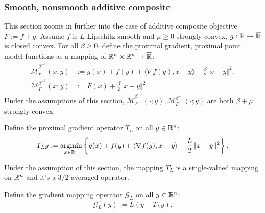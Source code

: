 \documentclass[12pt]{article}
\begin{document}
        \subsubsection{Smooth, nonsmooth additive composite}\label{sssec:additive-composite}
            This section zooms in further into the case of additive composite objective $F:= f + g$. 
            Assume $f$ is $L$ Lipschitz smooth and $\mu \ge 0$ strongly convex, $g: \mathbb R\rightarrow \overline {\mathbb R}$ is closed convex. 
            For all $\beta \ge 0$, define the proximal gradient, proximal point model functions as a mapping of $\mathbb R^n \times \mathbb R^n \rightarrow \overline {\mathbb R}$: 
            \begin{align*}
                \widetilde{\mathcal M}^{\beta^{-1}}_F
                (x; y)
                &:= 
                g(x) + f(y) + \langle \nabla f(y), x - y\rangle
                + \frac{\beta}{2}\Vert x - y\Vert^2,
                \\
                \mathcal M^{\beta^{-1}}_F(x; y) 
                &:= F(x) + \frac{\beta}{2}\Vert x - y\Vert^2.
            \end{align*}
            Under the assumptions of this section, $\widetilde {\mathcal M}_F^{\beta^{-1}} (\cdot; y),  {\mathcal M}_F^{\beta^{-1}}(\cdot;y )$ are both $\beta + \mu$ strongly convex. 
            \begin{definition}\label{def:proximal-gradient-operator}
                Define the proximal gradient operator $T_L$ on all $y \in \mathbb R^n$: 
                \begin{align*}
                    T_L y := \mathop{\rm argmin}\limits_{x \in \mathbb R^n} \left\lbrace
                        g(x) + f(y) + \langle \nabla f(y), x - y\rangle 
                        + \frac{L}{2}\Vert x- y \Vert^2
                    \right\rbrace. 
                \end{align*}
            \end{definition}
            \begin{remark}
                Under the assumption of this section, the mapping $T_L$ is a single-valued mapping on $\mathbb R^n$ and it's  a $3/2$ averaged operator. 
            \end{remark}
            \begin{definition}\label{def:gradient-mapping-operator}
                Define the gradient mapping operator $\mathcal G_L$ on all $y \in \mathbb R^n$: 
                \begin{align*}
                    \mathcal G_L (y):= L(y - T_L y). 
                \end{align*}
            \end{definition}
\end{document}
